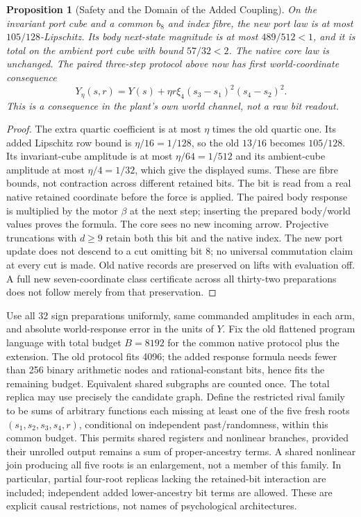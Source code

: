 \documentclass[11pt,a4paper]{article}
\newtheorem{proposition}[theorem]{Proposition}
\theoremstyle{definition}
\begin{document}
\begin{proposition}[Safety and the Domain of the Added Coupling]
\label{prop:bridge-prefix-coupling-safety}
On the invariant port cube and a common $b_8$ and index fibre, the new port
law is at most $105/128$-Lipschitz. Its body next-state magnitude is at most
$489/512<1$, and it is total on the ambient port cube with bound $57/32<2$.
The native core law is unchanged. The paired three-step protocol above now
has first world-coordinate consequence
\[
 Y_\eta(s,r)=Y(s)+\eta r\xi_4(s_3-s_1)^2(s_4-s_2)^2.
\]
This is a consequence in the plant's own world channel, not a raw bit readout.
\end{proposition}
\begin{proof}
The extra quartic coefficient is at most $\eta$ times the old quartic one.
Its added Lipschitz row bound is $\eta/16=1/128$, so the old $13/16$ becomes
$105/128$. Its invariant-cube amplitude is at most $\eta/64=1/512$ and its
ambient-cube amplitude at most $\eta/4=1/32$, which give the displayed sums.
These are fibre bounds, not contraction across different retained bits.
The bit is read from a real native retained coordinate before the force is
applied. The paired body response is multiplied by the motor $\beta$ at the
next step; inserting the prepared body/world values proves the formula.
The core sees no new incoming arrow. Projective truncations with $d\ge9$
retain both this bit and the native index. The new port update does not
descend to a cut omitting bit 8; no universal commutation claim at every cut
is made. Old native records are preserved on lifts with evaluation off.
A full new seven-coordinate class certificate across all thirty-two
preparations does not follow merely from that preservation.
\end{proof}

Use all $32$ sign preparations uniformly, same commanded amplitudes in each
arm, and absolute world-response error in the units of $Y$. Fix the old
flattened program language with total budget $B=8192$ for the common native
protocol plus the extension. The old protocol fits 4096; the added response
formula needs fewer than 256 binary arithmetic nodes and rational-constant
bits, hence fits the remaining budget. Equivalent shared subgraphs are
counted once. The total replica may use precisely the candidate graph.
Define the restricted rival family to be sums of arbitrary functions each
missing at least one of the five fresh roots $(s_1,s_2,s_3,s_4,r)$, conditional
on independent past/randomness, within this common budget. This permits
shared registers and nonlinear branches, provided their unrolled output
remains a sum of proper-ancestry terms. A shared nonlinear join producing
all five roots is an enlargement, not a member of this family. In particular,
partial four-root replicas lacking the retained-bit interaction are included;
independent added lower-ancestry bit terms are allowed. These are explicit
causal restrictions, not names of psychological architectures.
\end{document}
